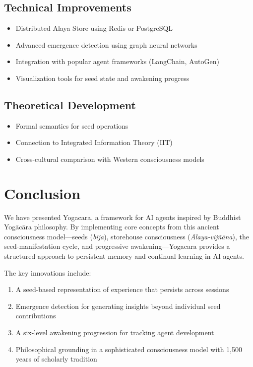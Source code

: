 \documentclass[11pt, a4paper]{article}
\begin{document}
\subsection{Technical Improvements}

\begin{itemize}
    \item Distributed Alaya Store using Redis or PostgreSQL
    \item Advanced emergence detection using graph neural networks
    \item Integration with popular agent frameworks (LangChain, AutoGen)
    \item Visualization tools for seed state and awakening progress
\end{itemize}

\subsection{Theoretical Development}

\begin{itemize}
    \item Formal semantics for seed operations
    \item Connection to Integrated Information Theory (IIT)
    \item Cross-cultural comparison with Western consciousness models
\end{itemize}

\section{Conclusion}

We have presented Yogacara, a framework for AI agents inspired by Buddhist Yogācāra philosophy. By implementing core concepts from this ancient consciousness model---seeds (\textit{bīja}), storehouse consciousness (\textit{Ālaya-vijñāna}), the seed-manifestation cycle, and progressive awakening---Yogacara provides a structured approach to persistent memory and continual learning in AI agents.

The key innovations include:
\begin{enumerate}
    \item A seed-based representation of experience that persists across sessions
    \item Emergence detection for generating insights beyond individual seed contributions
    \item A six-level awakening progression for tracking agent development
    \item Philosophical grounding in a sophisticated consciousness model with 1,500 years of scholarly tradition
\end{enumerate}
\end{document}
